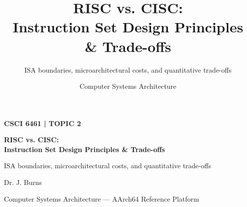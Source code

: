 \documentclass[aspectratio=169,11pt,t]{beamer}
\title[Topic 2]{
  RISC vs. CISC:\\
  Instruction Set Design Principles \& Trade-offs
}
\subtitle{
  ISA boundaries, microarchitectural costs,
  and quantitative trade-offs
}
\author{
  Computer Systems Architecture
}
\date{}
\begin{document}

\begin{frame}[plain]

\vspace{0.8cm}
\begin{minipage}{0.88\textwidth}
{\color{gold}\normalsize\bfseries CSCI 6461 \;|\; TOPIC 2\par}
\vspace{0.25cm}
{\color{white}\fontsize{24}{28}\selectfont\bfseries
 RISC vs. CISC:\\[0.08cm]
 Instruction Set Design Principles \& Trade-offs
\par}
\vspace{0.35cm}
{\color{white!80}\large
 ISA boundaries, microarchitectural costs,
 and quantitative trade-offs
\par}
\end{minipage}

\vfill
{\color{white}\normalsize Dr. J. Burns\par}
{\color{white!70}\small Computer Systems Architecture --- AArch64 Reference Platform\par}
\vspace{0.35cm}
\end{frame}

\end{document}
